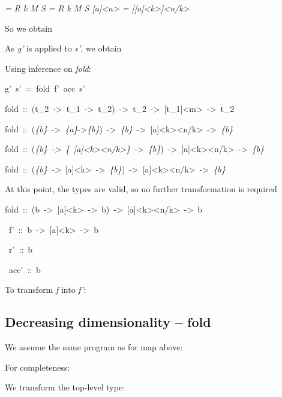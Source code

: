 \documentclass{article}
\newenvironment{lyxcode}
{\par\begin{list}{}{
\setlength{\rightmargin}{\leftmargin}
\setlength{\listparindent}{0pt}\raggedright
\setlength{\itemsep}{0pt}
\setlength{\parsep}{0pt}
\normalfont\ttfamily}\item[]}
{\end{list}}
\begin{document}
\emph{= R k M S } \emph{= R k M S {[}a{]}<n> = {[}{[}a{]}<k>{]}<n/k>}

So we obtain
\begin{lyxcode}

\end{lyxcode}
As \emph{g'} is applied to \emph{s'}, we obtain 
\begin{lyxcode}

\end{lyxcode}
Using inference on \emph{fold}:
\begin{lyxcode}
g'~s'~=~fold~f'~acc~s'

fold~::~(t\_2~->~t\_1~->~t\_2)~->~t\_2~->~{[}t\_1{]}<m>~->~t\_2

fold~::~(\emph{\{b\}}~->~\emph{\{a\}}->\emph{\{b\}})~->~\emph{\{b\}}~->~{[}a{]}<k><n/k>~->~\emph{\{b\}}

fold~::~(\emph{\{b\}~->~\{}~\emph{{[}a{]}<k><n/k>\}}~->~\emph{\{b\}})~->~{[}a{]}<k><n/k>~->~\emph{\{b\}}

fold~::~(\emph{\{b\}~->}~{[}a{]}<k>~->~\emph{\{b\}})~->~{[}a{]}<k><n/k>~->~\emph{\{b\}}
\end{lyxcode}
At this point, the types are valid, so no further transformation is
required
\begin{lyxcode}
fold~::~(b~->~{[}a{]}<k>~->~b)~->~{[}a{]}<k><n/k>~->~b

~f'~::~b~->~{[}a{]}<k>~->~b

~r'~::~b

~acc'~::~b
\end{lyxcode}
To transform \emph{f} into \emph{f'}:
\begin{lyxcode}

\end{lyxcode}

\subsection{Decreasing dimensionality -- fold}

We assume the same program as for map above:
\begin{lyxcode}













\end{lyxcode}
For completeness:
\begin{lyxcode}

\end{lyxcode}
We transform the top-level type:
\end{document}
